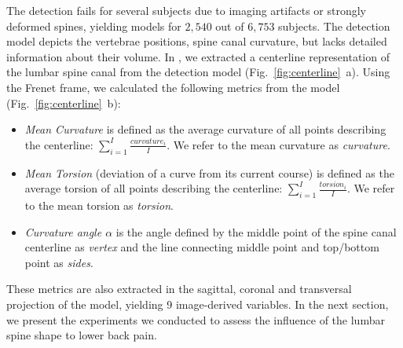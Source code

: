 \documentclass[a4paper,twoside]{style/article}
\begin{document}
The detection fails for several subjects due to imaging artifacts or strongly deformed spines, yielding models for $2,540$ out of $6,753$ subjects.
The detection model depicts the vertebrae positions, spine canal curvature, but lacks detailed information about their volume.
In \cite{Klemm2013VMV}, we extracted a centerline representation of the lumbar spine canal from the detection model (Fig.~\ref{fig:centerline}~a).
Using the Frenet frame, we calculated the following metrics from the model (Fig.~\ref{fig:centerline}~b): %
\begin{itemize}
	\item \emph{Mean Curvature} is defined as the average curvature of all points describing the centerline: $\sum_{i=1}^I \frac{\textit{curvature}_i}{I}$. We refer to the mean curvature as \emph{curvature}.
	\item \emph{Mean Torsion} (deviation of a curve from its current course) is defined as the average torsion of all points describing the centerline: $\sum_{i=1}^I \frac{\textit{torsion}_i}{I}$. We refer to the mean torsion as \emph{torsion}.
	\item \emph{Curvature angle $\alpha$} is the angle defined by the middle point of the spine canal centerline as \emph{vertex} and the line connecting middle point and top/bottom point as \emph{sides}.
\end{itemize}
These metrics are also extracted in the sagittal, coronal and transversal projection of the model, yielding 9 image-derived variables.
In the next section, we present the experiments we conducted to assess the influence of the lumbar spine shape to lower back pain.
\end{document}
